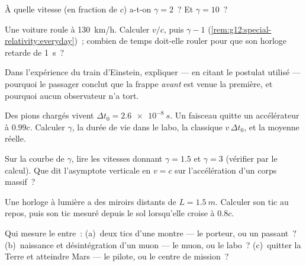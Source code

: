 \begin{exercise}[$\star$]\label{exo:g12:special-relativity:3}
À quelle vitesse (en fraction de $c$) a-t-on $\gamma = 2$~? Et
$\gamma = 10$~?
\end{exercise}

\begin{exercise}[$\star$]\label{exo:g12:special-relativity:4}
Une voiture roule à \qty{130}{km/h}. Calculer $v/c$, puis
$\gamma - 1$ (\cref{rem:g12:special-relativity:everyday})~; combien de
temps doit-elle rouler pour que son horloge retarde de \qty{1}{s}~?
\end{exercise}

\begin{exercise}[$\star$]\label{exo:g12:special-relativity:5}
Dans l'expérience du train d'Einstein, expliquer --- en citant le
postulat utilisé --- pourquoi le passager conclut que la frappe
\emph{avant} est venue la première, et pourquoi aucun observateur
n'a tort.
\end{exercise}

\begin{exercise}[$\star\star$]\label{exo:g12:special-relativity:6}
Des pions chargés vivent $\Delta t_0 = \qty{2.6e-8}{s}$. Un faisceau
quitte un accélérateur à $0.99c$. Calculer $\gamma$, la durée de vie
dans le labo, la  classique $v\,\Delta t_0$,
et la  moyenne réelle.
\end{exercise}

\begin{exercise}[$\star\star$]\label{exo:g12:special-relativity:7}
Sur la courbe de $\gamma$, lire les vitesses donnant $\gamma = 1.5$ et
$\gamma = 3$ (vérifier par le calcul). Que dit l'asymptote verticale
en $v = c$ sur l'accélération d'un corps massif~?
\end{exercise}

\begin{exercise}[$\star\star$]\label{exo:g12:special-relativity:8}
Une horloge à lumière a des miroirs distants de $L = \qty{1.5}{m}$.
Calculer son tic au repos, puis son tic mesuré depuis le sol lorsqu'elle
croise à $0.8c$.
\end{exercise}

\begin{exercise}[$\star\star$]\label{exo:g12:special-relativity:9}
Qui mesure le  entre~: (a)~deux
tics d'une montre --- le porteur, ou un passant~? (b)~naissance et
désintégration d'un muon --- le muon, ou le labo~? (c)~quitter la
Terre et atteindre Mars --- le pilote, ou le centre de mission~?
\end{exercise}

